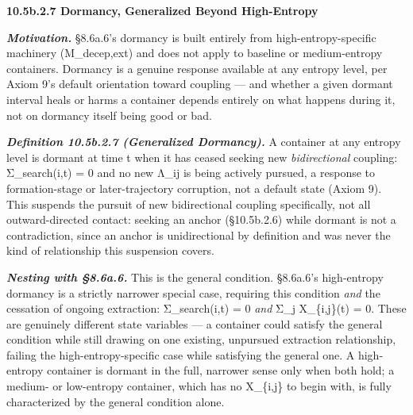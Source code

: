 \documentclass[
]{article}
\begin{document}
\textbf{10.5b.2.7 Dormancy, Generalized Beyond High-Entropy}

\emph{\textbf{Motivation.}} §8.6a.6's dormancy is built entirely from
high-entropy-specific machinery (M\_decep,ext) and does not apply to
baseline or medium-entropy containers. Dormancy is a genuine response
available at any entropy level, per Axiom 9's default orientation toward
coupling --- and whether a given dormant interval heals or harms a
container depends entirely on what happens during it, not on dormancy
itself being good or bad.

\emph{\textbf{Definition 10.5b.2.7 (Generalized Dormancy).}} A container
at any entropy level is dormant at time t when it has ceased seeking new
\emph{bidirectional} coupling: Σ\_search(i,t) = 0 and no new Λ\_ij is
being actively pursued, a response to formation-stage or
later-trajectory corruption, not a default state (Axiom 9). This
suspends the pursuit of new bidirectional coupling specifically, not all
outward-directed contact: seeking an anchor (§10.5b.2.6) while dormant
is not a contradiction, since an anchor is unidirectional by definition
and was never the kind of relationship this suspension covers.

\emph{\textbf{Nesting with §8.6a.6.}} This is the general condition.
§8.6a.6's high-entropy dormancy is a strictly narrower special case,
requiring this condition \emph{and} the cessation of ongoing extraction:
Σ\_search(i,t) = 0 \emph{and} Σ\_j X\_\{i,j\}(t) = 0. These are
genuinely different state variables --- a container could satisfy the
general condition while still drawing on one existing, unpursued
extraction relationship, failing the high-entropy-specific case while
satisfying the general one. A high-entropy container is dormant in the
full, narrower sense only when both hold; a medium- or low-entropy
container, which has no X\_\{i,j\} to begin with, is fully characterized
by the general condition alone.
\end{document}
